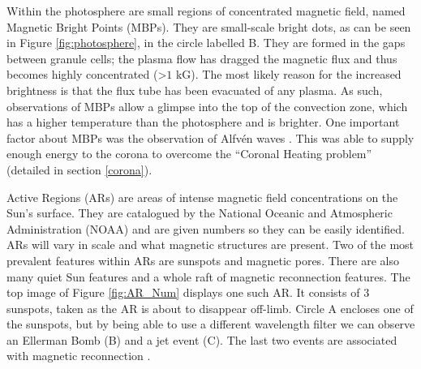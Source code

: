     Within the photosphere are small regions of concentrated magnetic field, named Magnetic Bright Points (MBPs).
    They are small-scale bright dots, as can be seen in Figure \ref{fig:photosphere}, in the circle labelled B.
    They are formed in the gaps between granule cells; the plasma flow has dragged the magnetic flux and thus becomes highly concentrated (>$1$ kG).
    The most likely reason for the increased brightness is that the flux tube has been evacuated of any plasma.
    As such, observations of MBPs allow a glimpse into the top of the convection zone, which has a higher temperature than the photosphere and is brighter.
    One important factor about MBPs was the observation of Alfv\'en waves \citep{Jess2009,Taroyan2009}.
    This was able to supply enough energy to the corona to overcome the ``Coronal Heating problem'' (detailed in section \ref{corona}).
        
    Active Regions (ARs) are areas of intense magnetic field concentrations on the Sun's surface.
    They are catalogued by the National Oceanic and Atmospheric Administration (NOAA) and are given numbers so they can be easily identified.
    ARs will vary in scale and what magnetic structures are present.
    Two of the most prevalent features within ARs are sunspots and magnetic pores.
    There are also many quiet Sun features and a whole raft of magnetic reconnection features. 
    The top image of Figure \ref{fig:AR_Num} displays one such AR. 
    It consists of $3$ sunspots, taken as the AR is about to disappear off-limb.
    Circle A encloses one of the sunspots, but by being able to use a different wavelength filter we can observe an Ellerman Bomb (B) and a jet event (C).
    The last two events are associated with magnetic reconnection \citep{2013SoPh..283..307N,2013A&A...560A..31N,2013ApJ...779..125N,2015ApJ...798...19N}.
     

